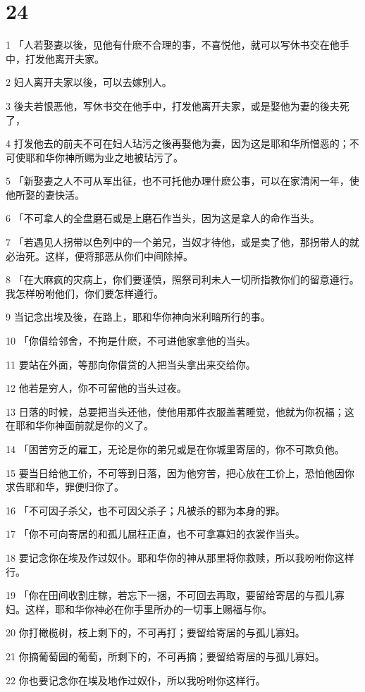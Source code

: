 \chapter{24}

\par 1 「人若娶妻以後，见他有什麽不合理的事，不喜悦他，就可以写休书交在他手中，打发他离开夫家。
\par 2 妇人离开夫家以後，可以去嫁别人。
\par 3 後夫若恨恶他，写休书交在他手中，打发他离开夫家，或是娶他为妻的後夫死了，
\par 4 打发他去的前夫不可在妇人玷污之後再娶他为妻，因为这是耶和华所憎恶的；不可使耶和华你神所赐为业之地被玷污了。
\par 5 「新娶妻之人不可从军出征，也不可托他办理什麽公事，可以在家清闲一年，使他所娶的妻快活。
\par 6 「不可拿人的全盘磨石或是上磨石作当头，因为这是拿人的命作当头。
\par 7 「若遇见人拐带以色列中的一个弟兄，当奴才待他，或是卖了他，那拐带人的就必治死。这样，便将那恶从你们中间除掉。
\par 8 「在大麻疯的灾病上，你们要谨慎，照祭司利未人一切所指教你们的留意遵行。我怎样吩咐他们，你们要怎样遵行。
\par 9 当记念出埃及後，在路上，耶和华你神向米利暗所行的事。
\par 10 「你借给邻舍，不拘是什麽，不可进他家拿他的当头。
\par 11 要站在外面，等那向你借贷的人把当头拿出来交给你。
\par 12 他若是穷人，你不可留他的当头过夜。
\par 13 日落的时候，总要把当头还他，使他用那件衣服盖著睡觉，他就为你祝福；这在耶和华你神面前就是你的义了。
\par 14 「困苦穷乏的雇工，无论是你的弟兄或是在你城里寄居的，你不可欺负他。
\par 15 要当日给他工价，不可等到日落，因为他穷苦，把心放在工价上，恐怕他因你求告耶和华，罪便归你了。
\par 16 「不可因子杀父，也不可因父杀子；凡被杀的都为本身的罪。
\par 17 「你不可向寄居的和孤儿屈枉正直，也不可拿寡妇的衣裳作当头。
\par 18 要记念你在埃及作过奴仆。耶和华你的神从那里将你救赎，所以我吩咐你这样行。
\par 19 「你在田间收割庄稼，若忘下一捆，不可回去再取，要留给寄居的与孤儿寡妇。这样，耶和华你神必在你手里所办的一切事上赐福与你。
\par 20 你打橄榄树，枝上剩下的，不可再打；要留给寄居的与孤儿寡妇。
\par 21 你摘葡萄园的葡萄，所剩下的，不可再摘；要留给寄居的与孤儿寡妇。
\par 22 你也要记念你在埃及地作过奴仆，所以我吩咐你这样行。

